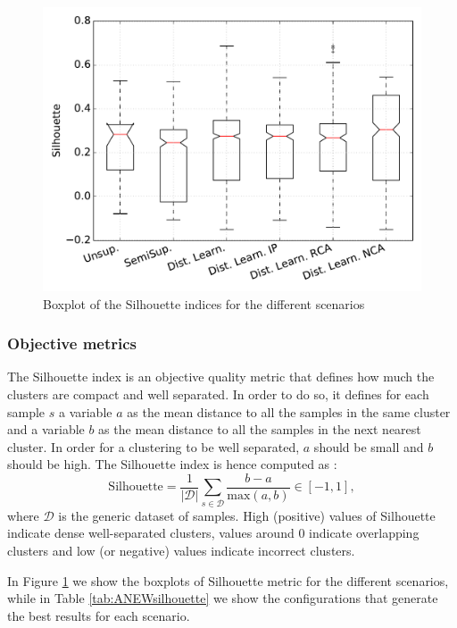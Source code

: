 \begin{figure}[tbph]
  \centering 
  \includegraphics[width=0.85\columnwidth]{img/ANEW/Silhouette2.pdf}
  \caption{Boxplot of the Silhouette indices for the different scenarios}
  \label{fig:ANEWsilhouette}
\end{figure}  


\subsubsection{Objective metrics} \label{sec:ANEW:obj_results}
The Silhouette index is an objective quality metric that defines how much the clusters are compact and well separated. In order to do so, it defines for each sample $s$ a variable $a$ as the mean distance to all the samples in the same cluster and a variable $b$ as the mean distance to all the samples in the next nearest cluster. In order for a clustering to be well separated, $a$ should be small and $b$ should be high. The Silhouette index is hence computed as \cite{scikit-learn}:
\begin{equation}
\text{Silhouette}=\frac{1}{|\mathcal{D}|} \sum_{s \in \mathcal{D}} \frac{b-a}{\text{max}(a,b)}\in [-1,1],
\end{equation}
where $\mathcal{D}$ is the generic dataset of samples.  High (positive) values of Silhouette indicate dense well-separated clusters, values around $0$ indicate overlapping clusters and low (or negative) values indicate incorrect clusters. 

In Figure \ref{fig:ANEWsilhouette} we show the boxplots of Silhouette metric for the different scenarios, while in Table \ref{tab:ANEWsilhouette} we show the configurations that generate the best results for each scenario. 


